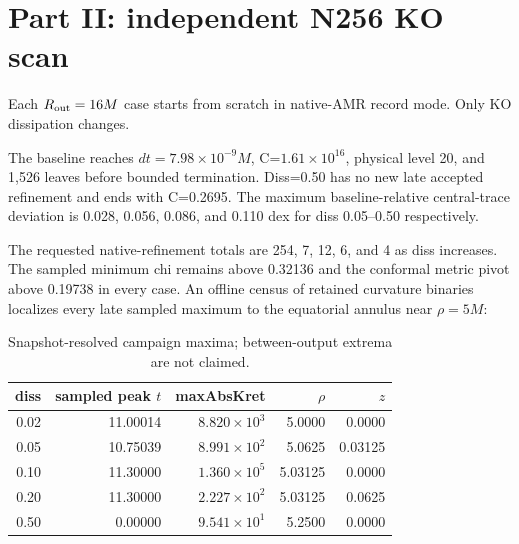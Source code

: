 \documentclass[11pt]{article}
\begin{document}
\section{Part II: independent N256 KO scan}

Each $R_{\rm out}=16M$ case starts from scratch in native-AMR record mode.
Only KO dissipation changes.

\begin{table}[H]\centering\scriptsize
{}
\caption{Independent N256 KO scan.}
\end{table}

The baseline reaches $dt=7.98\times10^{-9}M$, C=$1.61\times10^{16}$, physical
level 20, and 1,526 leaves before bounded termination. Diss=0.50 has no new
late accepted refinement and ends with C=0.2695. The maximum baseline-relative
central-trace deviation is 0.028, 0.056, 0.086, and 0.110 dex for diss
0.05--0.50 respectively.

The requested native-refinement totals are 254, 7, 12, 6, and 4 as diss
increases. The sampled minimum chi remains above 0.32136 and the conformal
metric pivot above 0.19738 in every case. An offline census of retained
curvature binaries localizes every late sampled maximum to the equatorial
annulus near $\rho=5M$:

\begin{table}[H]\centering\small
\begin{tabular}{rrrrr}
\toprule
diss & sampled peak $t$ & maxAbsKret & $\rho$ & $z$\\
\midrule
0.02 & 11.00014 & $8.820{\times}10^3$ & 5.0000 & 0.0000\\
0.05 & 10.75039 & $8.991{\times}10^2$ & 5.0625 & 0.03125\\
0.10 & 11.30000 & $1.360{\times}10^5$ & 5.03125 & 0.0000\\
0.20 & 11.30000 & $2.227{\times}10^2$ & 5.03125 & 0.0625\\
0.50 & 0.00000 & $9.541{\times}10^1$ & 5.2500 & 0.0000\\
\bottomrule
\end{tabular}
\caption{Snapshot-resolved campaign maxima; between-output extrema are not claimed.}
\end{table}
\end{document}
